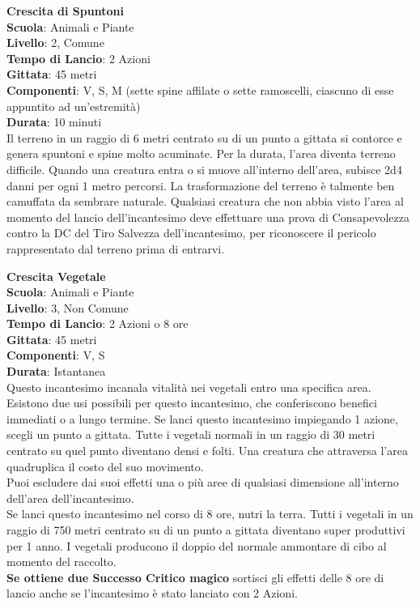 \begin{multicols}{2}
\medskip\textbf{Crescita di Spuntoni}\\
\textbf{Scuola}: Animali e Piante\\
\textbf{Livello}: 2, Comune\\
\textbf{Tempo di Lancio}: 2 Azioni\\
\textbf{Gittata}: 45 metri\\
\textbf{Componenti}: V, S, M (sette spine affilate o sette ramoscelli, ciascuno di esse appuntito ad un'estremità)\\
\textbf{Durata}: 10 minuti\\
Il terreno in un raggio di 6 metri centrato su di un punto a gittata si contorce e genera spuntoni e spine molto acuminate. Per la durata, l'area diventa terreno difficile. Quando una creatura entra o si muove all'interno dell'area, subisce 2d4 danni per ogni 1 metro percorsi.
La trasformazione del terreno è talmente ben camuffata da sembrare naturale. Qualsiasi creatura che non abbia visto l'area al momento del lancio dell'incantesimo deve effettuare una prova di Consapevolezza contro la DC del Tiro Salvezza dell'incantesimo, per riconoscere il pericolo rappresentato dal terreno prima di entrarvi.

\medskip\textbf{Crescita Vegetale}\\
\textbf{Scuola}: Animali e Piante\\
\textbf{Livello}: 3, Non Comune\\
\textbf{Tempo di Lancio}: 2 Azioni o 8 ore\\
\textbf{Gittata}: 45 metri\\
\textbf{Componenti}: V, S\\
\textbf{Durata}: Istantanea\\
Questo incantesimo incanala vitalità nei vegetali entro una specifica area. Esistono due usi possibili per questo incantesimo, che conferiscono benefici immediati o a lungo termine. Se lanci questo incantesimo impiegando 1 azione, scegli un punto a gittata. Tutte i vegetali normali in un raggio di 30 metri centrato su quel punto diventano densi e folti. Una creatura che attraversa l'area quadruplica il costo del suo movimento.\\
Puoi escludere dai suoi effetti una o più aree di qualsiasi dimensione all'interno dell'area dell'incantesimo.\\
Se lanci questo incantesimo nel corso di 8 ore, nutri la terra. Tutti i vegetali in un raggio di 750 metri centrato su di un punto a gittata diventano super produttivi per 1 anno. I vegetali producono il doppio del normale ammontare di cibo al momento del raccolto.\\
\textbf{Se ottiene due Successo Critico magico} sortisci gli effetti delle 8 ore di lancio anche se l'incantesimo è stato lanciato con 2 Azioni.


\end{multicols}
